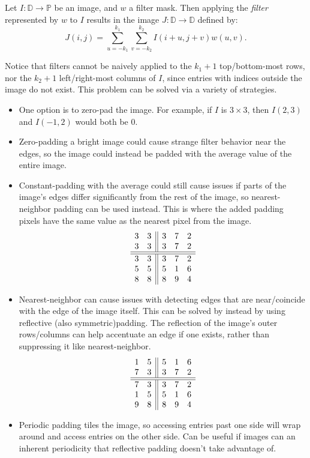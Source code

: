 \begin{defn}
    Let $I: \mathbb{D} \to \mathbb{P}$ be an image, and $w$ a filter mask. Then applying the \emph{filter} represented by $w$ to $I$ results in the image $J: \mathbb{D} \to \mathbb{D}$ defined by: \[J(i, j) = \sum_{u = -k_1}^{k_1}\sum_{v = -k_2}^{k_2}I(i + u, j + v)w(u, v).\]
\end{defn}

Notice that filters cannot be naively applied to the $k_1 + 1$ top/bottom-most rows, nor the $k_2 + 1$ left/right-most columns of $I$, since entries with indices outside the image do not exist. This problem can be solved via a variety of strategies.
\begin{itemize}
    \item One option is to zero-pad the image. For example, if $I$ is $3 \times 3$, then $I(2, 3)$ and $I(-1, 2)$ would both be $0$.
    \item Zero-padding a bright image could cause strange filter behavior near the edges, so the image could instead be padded with the average value of the entire image.
    \item Constant-padding with the average could still cause issues if parts of the image's edges differ significantly from the rest of the image, so nearest-neighbor padding can be used instead. This is where the added padding pixels have the same value as the nearest pixel from the image.
    \[\begin{array}{c c||c c c}
        3 & 3 & 3 & 7 & 2 \\
        3 & 3 & 3 & 7 & 2\\
        \hline \hline
        3 & 3 & 3 & 7 & 2 \\
        5 & 5 & 5 & 1 & 6 \\
        8 & 8 & 8 & 9 & 4 \\
    \end{array}\]
    \item Nearest-neighbor can cause issues with detecting edges that are near/coincide with the edge of the image itself. This can be solved by instead by using reflective (also symmetric)padding. The reflection of the image's outer rows/columns can help accentuate an edge if one exists, rather than suppressing it like nearest-neighbor.
    \[\begin{array}{c c||c c c}
        1 & 5 & 5 & 1 & 6 \\
        7 & 3 & 3 & 7 & 2\\
        \hline \hline
        7 & 3 & 3 & 7 & 2 \\
        1 & 5 & 5 & 1 & 6 \\
        9 & 8 & 8 & 9 & 4 \\
    \end{array}\]
    \item Periodic padding tiles the image, so accessing entries past one side will wrap around and access entries on the other side. Can be useful if images can an inherent periodicity that reflective padding doesn't take advantage of.
\end{itemize}

